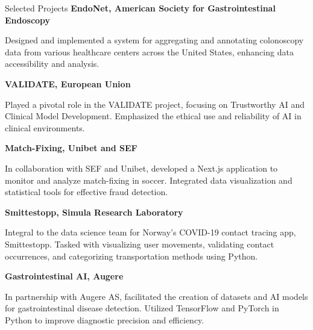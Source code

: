 \begin{rubric}{Selected Projects}
%
\entry*[2023]%
\textbf{EndoNet, American Society for Gastrointestinal Endoscopy} \par
\begin{compactitem}
\item Designed and implemented a system for aggregating and annotating colonoscopy data from various healthcare centers across the United States, enhancing data accessibility and analysis.
\vspace{-12pt}
\end{compactitem}
%
\entry*[2023]%
\textbf{VALIDATE, European Union}
\begin{compactitem}
\item Played a pivotal role in the VALIDATE project, focusing on Trustworthy AI and Clinical Model Development. Emphasized the ethical use and reliability of AI in clinical environments.
\vspace{-12pt}
\end{compactitem}
%
\entry*[2022]%
\textbf{Match-Fixing, Unibet and SEF} \par
\begin{compactitem}
\item In collaboration with SEF and Unibet, developed a Next.js application to monitor and analyze match-fixing in soccer. Integrated data visualization and statistical tools for effective fraud detection.
\vspace{-12pt}
\end{compactitem}
%
\entry*[2020]%
\textbf{Smittestopp, Simula Research Laboratory} \par
\begin{compactitem}
\item Integral to the data science team for Norway's COVID-19 contact tracing app, Smittestopp. Tasked with visualizing user movements, validating contact occurrences, and categorizing transportation methods using Python.
\vspace{-12pt}
\end{compactitem}
%
\entry*[2019]%
\textbf{Gastrointestinal AI, Augere} \par
\begin{compactitem}
\item In partnership with Augere AS, facilitated the creation of datasets and AI models for gastrointestinal disease detection. Utilized TensorFlow and PyTorch in Python to improve diagnostic precision and efficiency.
\vspace{-12pt}
\end{compactitem}

\end{rubric}
